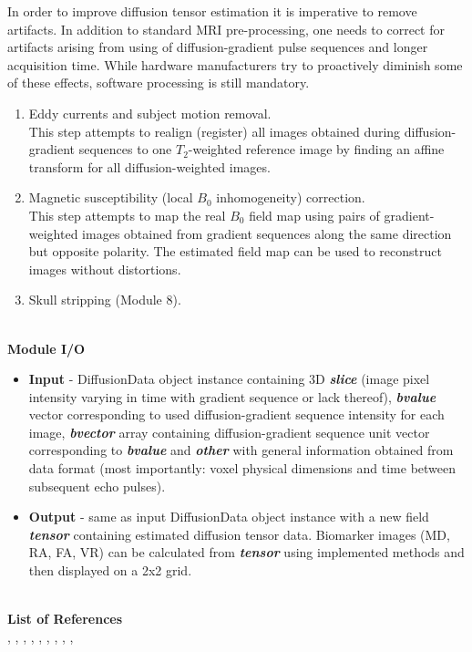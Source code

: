 In order to improve diffusion tensor estimation it is imperative to
remove artifacts. In addition to standard MRI pre-processing, one
needs to correct for artifacts arising from using of diffusion-gradient
pulse sequences and longer acquisition time. While hardware manufacturers
try to proactively diminish some of these effects, software processing
is still mandatory. 
\begin{enumerate}
\item Eddy currents and subject motion removal.\\
This step attempts to realign (register) all images obtained during
diffusion-gradient sequences to one $T_{2}$-weighted reference image
by finding an affine transform for all diffusion-weighted images. 
\item Magnetic susceptibility (local $B_{0}$ inhomogeneity) correction.\\
This step attempts to map the real $B_{0}$ field map using pairs
of gradient-weighted images obtained from gradient sequences along
the same direction but opposite polarity. The estimated field map
can be used to reconstruct images without distortions. 
\item Skull stripping (Module 8). 
\end{enumerate}
\hfill{}\\
\textbf{Module I/O} 
\begin{itemize}
\item \textbf{Input} - DiffusionData object instance containing 3D \textbf{\emph{slice}}
(image pixel intensity varying in time with gradient sequence or lack
thereof), \textbf{\emph{bvalue}} vector corresponding to used diffusion-gradient
sequence intensity for each image, \textbf{\emph{bvector}} array containing
diffusion-gradient sequence unit vector corresponding to \textbf{\emph{bvalue}}
and \textbf{\emph{other}} with general information obtained from data
format (most importantly: voxel physical dimensions and time between
subsequent echo pulses). 
\item \textbf{Output} - same as input DiffusionData object instance with
a new field \textbf{\emph{tensor}} containing estimated diffusion
tensor data. Biomarker images (MD, RA, FA, VR) can be calculated from
\textbf{\emph{tensor}} using implemented methods and then displayed
on a 2x2 grid. 
\end{itemize}
\hfill{}\\
\textbf{List of References}\\
\cite{6_dti_1}, \cite{6_dti_2}, \cite{6_dti_3}, \cite{6_dti_4},
\cite{6_dti_5}, \cite{6_dti_6}, \cite{6_dti_7}, \cite{6_dti_8},
\cite{6_dti_9}, \cite{6_dti_10}